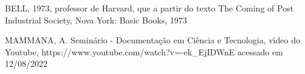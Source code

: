 \documentclass[
12pt,		%
openright,	%
twoside,  %
a4paper,			%
chapter=TITLE,		%
english,			%
french,				%
spanish,			%
brazil				%
]{USPSC-classe/USPSC}
\begin{document}
\begin{flushleft}
\begin{flushleft}
\begin{flushleft}
\begin{flushleft}
\begin{flushleft}
\begin{flushleft}
\begin{flushleft}
\begin{flushleft}
[BELL, 1973]  BELL, 1973, professor de Harvard, que a partir do texto The Coming of Post Industrial Society, Nova York: Basic Books, 1973
\end{flushleft}


\end{flushleft}


\end{flushleft}


\end{flushleft}


\end{flushleft}


\end{flushleft}


\end{flushleft}


\end{flushleft}


\begin{flushleft}
\begin{flushleft}
\begin{flushleft}
\begin{flushleft}
\begin{flushleft}
\begin{flushleft}
\begin{flushleft}
\begin{flushleft}
[MAMMANA, 2020] MAMMANA, A. Semin\'ario - Documenta\c{c}\~ao em Ci\^encia e Tecnologia, v\'{\i}deo do Youtube, https://www.youtube.com/watch?v=-ek\_EjIDWnE acessado em 12/08/2022
\end{flushleft}


\end{flushleft}


\end{flushleft}


\end{flushleft}


\end{flushleft}


\end{flushleft}


\end{flushleft}


\end{flushleft}
\end{document}

